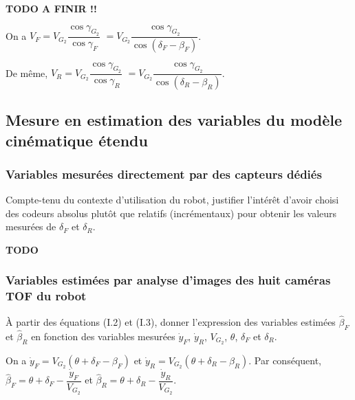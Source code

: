 \documentclass[11pt]{article}
\begin{document}
\begin{UPSTIcorrige}
\textbf{TODO A FINIR !!}

On a $V_{F}  =V_{G_2} \dfrac{\cos \gamma_{G_2}}{\cos \gamma_{F}}$ $=V_{G_2} \dfrac{\cos \gamma_{G_2}}{\cos  \left(\delta_F-\beta_F \right)}$. 

De même, $V_{R}  =V_{G_2} \dfrac{\cos \gamma_{G_2}}{\cos \gamma_{R}}$ $=V_{G_2} \dfrac{\cos \gamma_{G_2}}{\cos  \left(\delta_R-\beta_R \right)}$. 
\end{UPSTIcorrige}


\subsection{Mesure en estimation des variables du modèle cinématique étendu}


\subsubsection{Variables mesurées directement par des capteurs dédiés}

\UPSTIquestion Compte-tenu du contexte d’utilisation du robot, justifier l’intérêt d’avoir choisi des codeurs absolus
plutôt que relatifs (incrémentaux) pour obtenir les valeurs mesurées de $\delta_F$ et $\delta_R$.

\begin{UPSTIcorrige}
\textbf{TODO}
\end{UPSTIcorrige}

\subsubsection{Variables estimées par analyse d’images des huit caméras TOF du robot}

\UPSTIquestion À partir des équations (I.2) et (I.3), donner l’expression des variables estimées $\hat{\beta}_F$
et $\hat{\beta}_R$ en fonction des variables mesurées $\dot{y}_F$, $\dot{y}_R$, $V_{G_2}$, $\theta$, $\delta_F$ et $\delta_R$.

\begin{UPSTIcorrige}
On a $\dot{y}_F =V_{G_2} \left(\theta + \delta_F - \beta_F\right)$ et $\dot{y}_R =V_{G_2} \left(\theta + \delta_R - \beta_R\right)$. Par conséquent, $\hat{\beta}_F =\theta + \delta_F-\dfrac{\dot{y}_F}{V_{G_2} }  $ et $\hat{\beta}_R =\theta + \delta_R-\dfrac{\dot{y}_R}{V_{G_2} }  $.
\end{UPSTIcorrige}
\end{document}
